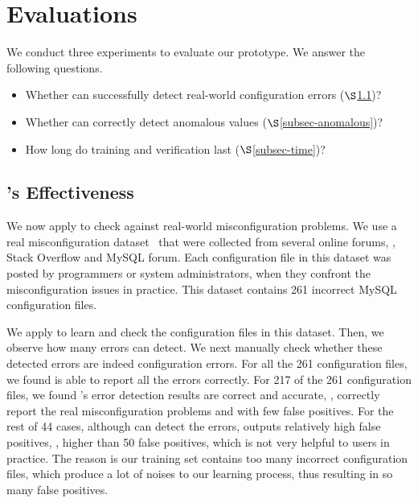 
\section{Evaluations}
\label{sec-eval}

We conduct three experiments to evaluate our \app
prototype. We answer the following
questions.

\begin{itemize}

\item Whether \app can successfully 
  detect real-world configuration errors ($\S$\ref{subsec-effectiveness})?

\item Whether \app can correctly detect anomalous values
($\S$\ref{subsec-anomalous})?

\item How long do training and verification last ($\S$\ref{subsec-time})?

\end{itemize}



\subsection{\app's Effectiveness}
\label{subsec-effectiveness}

We now apply \app to check against real-world misconfiguration problems.
We use a real misconfiguration dataset~\cite{configdataset}
that were collected from several online forums, \eg, 
Stack Overflow and MySQL forum.
Each configuration file in this dataset was posted by 
programmers or system administrators, 
when they confront the misconfiguration issues in practice.
This dataset contains 261 incorrect MySQL configuration files.

We apply \app to learn and check the configuration files in this
dataset. Then, we observe how many errors \app can detect.
We next manually check whether these detected errors are indeed
configuration errors.
For all the 261 configuration files, we found \app is
able to report all the errors correctly.
For 217 of the 261 configuration files, we found \app's 
error detection results are correct and accurate,
\ie, correctly report the real misconfiguration problems
and with few false positives.
For the rest of 44 cases, 
although \app can detect the errors,
\app outputs relatively high false positives,
\eg, higher than 50 false positives,
which is not very helpful to users in practice.
The reason is our training set contains too many incorrect configuration
files, which produce a lot of noises to our learning process,
thus resulting in so many false positives.
  
